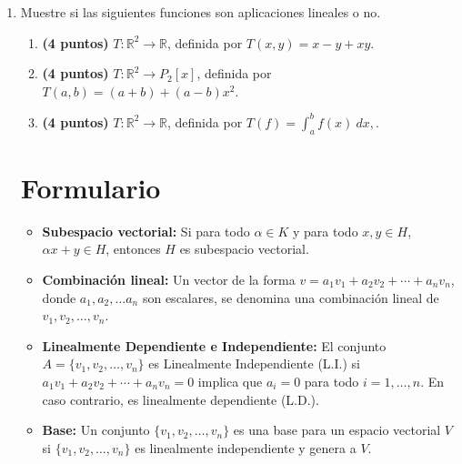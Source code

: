 \documentclass[a4paper]{article}
\begin{document}
\begin{enumerate}
    \[W=<\{(1,0,2),(5,-1,0)\}>\]
     
     \begin{enumerate}
         \item Encuentre el complemento ortogonal $W^ \perp$.
         \item Encuentre una base para el espacio $W+ W^\perp$. Justifique
     \end{enumerate}





    \newpage
     \item Muestre si las siguientes funciones son aplicaciones lineales o no.
     
     \begin{enumerate}
         \item {\bf (4 puntos)} $T:\mathbb{R}^2\to \mathbb{R}$, definida por $T(x,y)=x-y+xy$.
        \item {\bf (4 puntos)} $T:\mathbb{R}^2\to P_2[x]$, definida por $T(a,b)=(a+b)+(a-b)x^2$.
        \item {\bf (4 puntos)} $T:\mathbb{R}^2\to \mathbb{R}$, definida por $T(f)=\int_a^b f(x) \: dx,$.
     \end{enumerate}

        
   \newpage 

\section*{Formulario}

\begin{itemize}
    \item {\bf Subespacio vectorial: }Si para todo $\alpha \in K$ y para todo $x, y \in H$, $\alpha x+y \in H$, entonces $H$ es subespacio vectorial.
    \item {\bf Combinación lineal: } Un vector de la forma $v = a_1 v_1 + a_2v_2 + \cdots +a_n v_n$, donde $a_1, a_2, \dots a_n$ son escalares, se denomina una combinación lineal de $v_1, v_2, \dots , v_n$.
\item {\bf Linealmente Dependiente e Independiente: }El conjunto $A=\{v_1, v_2, \dots, v_n\}$ es
Linealmente Independiente (L.I.) si $ a_1 v_1 + a_2v_2 + \cdots +a_n v_n=0$ implica que $a_i=0$ para todo $i=1, \dots, n.$ En caso contrario, es linealmente dependiente (L.D.).
\item {\bf Base: } Un conjunto $\{ v_1,v_2, \dots, v_n \}$ es una base para un espacio vectorial $V$ si $\{ v_1,v_2, \dots, v_n \}$ es linealmente independiente y genera a $V$.


\end{itemize}
\end{enumerate}
\end{document}
